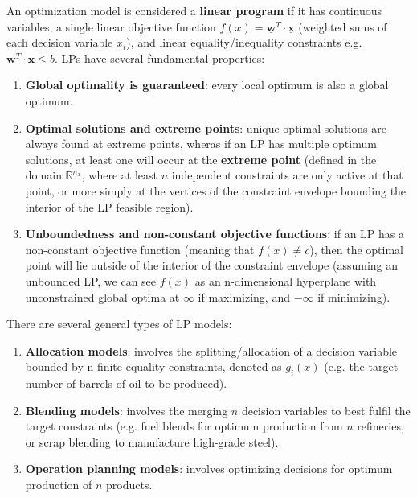\documentclass{article}
\begin{document}
An optimization model is considered a \textbf{linear program} if it has continuous variables, a single linear objective function \(f\left(x\right) = \underline{\textbf{w}}^T \cdot \underline{\textbf{x}} \) (weighted sums of each decision variable \(x_i\)), and linear equality/inequality constraints e.g. \(\underline{\textbf{w}}^T \cdot \underline{\textbf{x}} \leq b\). LPs have several fundamental properties:
\begin{enumerate}
    \item \textbf{Global optimality is guaranteed}: every local optimum is also a global optimum.
    \item \textbf{Optimal solutions and extreme points}: unique optimal solutions are always found at extreme points, wheras if an LP has multiple optimum solutions, at least one will occur at the \textbf{extreme point} (defined in the domain \(\mathbb{R}^{n_x}\), where at least \(n\) independent constraints are only active at that point, or more simply at the vertices of the constraint envelope bounding the interior of the LP feasible region).
    \item \textbf{Unboundedness and non-constant objective functions}: if an LP has a non-constant objective function (meaning that \(f\left(x\right) \neq c\)), then the optimal point will lie outside of the interior of the constraint envelope (assuming an unbounded LP, we can see \(f\left(x\right)\) as an n-dimensional hyperplane with unconstrained global optima at \(\infty\) if maximizing, and \(-\infty\) if minimizing). 
\end{enumerate}

There are several general types of LP models:
\begin{enumerate}
    \item \textbf{Allocation models}: involves the splitting/allocation of a decision variable bounded by n finite equality constraints, denoted as \(g_i\left(x\right)\) (e.g. the target number of barrels of oil to be produced).
    \item \textbf{Blending models}: involves the merging \(n\) decision variables to best fulfil the target constraints (e.g. fuel blends for optimum production from \(n\) refineries, or scrap blending to manufacture high-grade steel).
    \item \textbf{Operation planning models}: involves optimizing decisions for optimum production of \(n\) products.
\end{enumerate}
\end{document}

